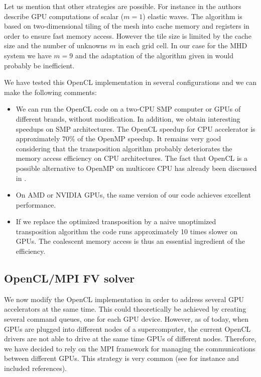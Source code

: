 \documentclass[preprint]{sig-alternate}
\begin{document}
Let us mention that other strategies are possible. For instance in \cite{michea2010accelerating} the authors describe GPU computations of scalar ($m=1$) elastic waves. The algorithm is based on two-dimensional tiling of the mesh into cache memory and registers in order to ensure fast memory access. However the tile size is limited by the cache size and the number of unknowns $m$ in each grid cell. In our case for the MHD system we have $m=9$ and the adaptation of the algorithm given in \cite{michea2010accelerating} would probably be inefficient.

We have tested this OpenCL implementation in several configurations and we can make the following comments:
\begin{itemize}
\item We can run the OpenCL code on a two-CPU SMP computer or GPUs of different brands, without modification. In addition,  we obtain interesting speedups on SMP architectures. The OpenCL speedup for CPU accelerator is approximately $70\%$ of the OpenMP speedup. It remains very good considering that the transposition algorithm probably  deteriorates the memory access efficiency on CPU architectures. The fact that OpenCL is a possible alternative to OpenMP on multicore CPU has already been discussed in \cite{shen2012performance}.
\item  On AMD or NVIDIA GPUs, the same version of our code achieves excellent performance.
\item If we replace the optimized transposition by a naive unoptimized transposition algorithm the code runs approximately 10 times slower on GPUs. The coalescent memory access is thus an essential ingredient of the efficiency.
\end{itemize}

\subsection{OpenCL/MPI FV solver}

We now modify the OpenCL implementation in order to address several GPU accelerators at the same time. This could theoretically be achieved by creating several command queues, one for each GPU device. However, as of today, when GPUs are plugged into different nodes of a supercomputer, the current OpenCL drivers are not able to drive at the same time GPUs of different nodes. Therefore, we have decided to rely on the MPI framework for managing the communications between different GPUs. This strategy is very common (see for instance \cite{aubert2010numerical,cabel2011multi,helluy2014two} and included references).
\end{document}
